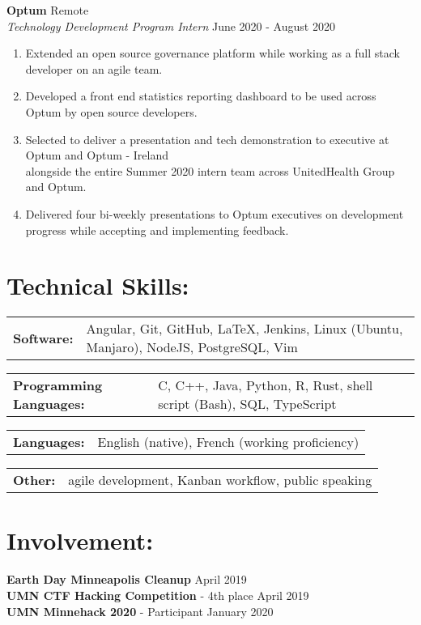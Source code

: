 \documentclass[10pt]{article}
\begin{document}
		\noindent
		\textbf{Optum} \hfill Remote \\
		\textit{Technology Development Program Intern} \hfill June 2020 - August 2020
		\begin{enumerate}[label=--]
			\item Extended an open source governance platform while working as a full stack developer on an agile team.
			\item Developed a front end statistics reporting dashboard to be used across Optum by open source developers.
			\item Selected to deliver a presentation and tech demonstration to executive at Optum and Optum - Ireland \\ alongside the entire Summer 2020 intern team across UnitedHealth Group and Optum.
			\item Delivered four bi-weekly presentations to Optum executives on development progress while accepting and implementing feedback.
		\end{enumerate}
		
	\section*{Technical Skills: \hrulefill}
		\begin{tabular}{@{}l@{\ }l}
		\textbf{Software: } & Angular, Git, GitHub, {\large \LaTeX},  Jenkins, Linux (Ubuntu, Manjaro), NodeJS, PostgreSQL, Vim
		\end{tabular}
		
		\vspace{5pt}
		\noindent
		\begin{tabular}{@{}l@{\ }l}
		\textbf{Programming Languages: } & C, C++, Java, Python, R, Rust, shell script (Bash), SQL, TypeScript\\
		\end{tabular}
		
		\vspace{5pt}
		\noindent
		\begin{tabular}{@{}l@{\ }l}
		\textbf{Languages: } & English (native), French (working proficiency) \\
		\end{tabular}
		
		\vspace{5pt}
		\noindent
		\begin{tabular}{@{}l@{\ }l}
		\textbf{Other: } &  agile development, Kanban workflow, public speaking \\
		\end{tabular}
			
	\section*{Involvement: \hrulefill}
		\textbf{Earth Day Minneapolis Cleanup} \hfill April 2019 \\
		\textbf{UMN CTF Hacking Competition} - 4th place \hfill April 2019 \\
		\textbf{UMN Minnehack 2020 } - Participant \hfill January 2020\\
		
\end{document}
